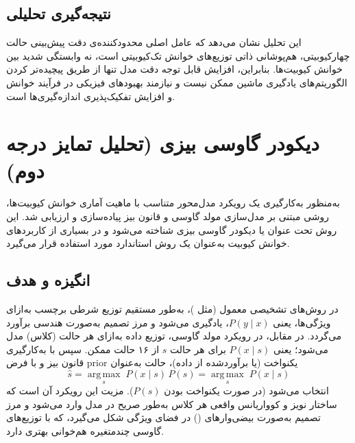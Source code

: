 \subsection{نتیجه‌گیری تحلیلی}
این تحلیل نشان می‌دهد که عامل اصلی محدودکننده‌ی دقت پیش‌بینی حالت چهارکیوبیتی، هم‌پوشانی ذاتی توزیع‌های خوانش تک‌کیوبیتی است، نه وابستگی شدید بین خوانش کیوبیت‌ها. بنابراین، افزایش قابل توجه دقت مدل تنها از طریق پیچیده‌تر کردن الگوریتم‌های یادگیری ماشین ممکن نیست و نیازمند بهبودهای فیزیکی در فرآیند خوانش و افزایش تفکیک‌پذیری اندازه‌گیری‌ها است.


\section{دیکودر گاوسی بیزی (تحلیل تمایز درجه دوم)}
به‌منظور به‌کارگیری یک رویکرد مدل‌محور متناسب با ماهیت آماری خوانش کیوبیت‌ها، روشی مبتنی بر مدل‌سازی مولد گاوسی و قانون بیز پیاده‌سازی و ارزیابی شد. این روش تحت عنوان  یا دیکودر گاوسی بیزی شناخته می‌شود و در بسیاری از کاربردهای خوانش کیوبیت به‌عنوان یک روش استاندارد مورد استفاده قرار می‌گیرد.

\subsection{انگیزه و هدف}
در روش‌های تشخیصی معمول (مثل )، به‌طور مستقیم توزیع شرطی برچسب به‌ازای ویژگی‌ها، یعنی $P(y \mid x)$، یادگیری می‌شود و مرز تصمیم به‌صورت هندسی برآورد می‌گردد. در مقابل، در رویکرد مولد گاوسی، توزیع داده به‌ازای هر حالت (کلاس) مدل می‌شود؛ یعنی $P(x \mid s)$ برای هر حالت $s$ از ۱۶ حالت ممکن. سپس با به‌کارگیری قانون بیز و با فرض prior یکنواخت (یا برآوردشده از داده)، حالت به‌عنوان
\begin{equation}
	\hat{s} = \operatorname*{arg\,max}_{s} \; P(x \mid s)\, P(s) = \operatorname*{arg\,max}_{s} \; P(x \mid s)
	\label{eq:bayes-decoder}
\end{equation}
انتخاب می‌شود (در صورت یکنواخت بودن $P(s)$). مزیت این رویکرد آن است که ساختار نویز و کوواریانس واقعی هر کلاس به‌طور صریح در مدل وارد می‌شود و مرز تصمیم به‌صورت بیضی‌وارهای () در فضای ویژگی شکل می‌گیرد، که با توزیع‌های گاوسی چندمتغیره هم‌خوانی بهتری دارد.

